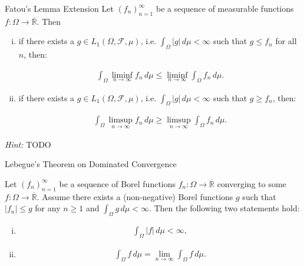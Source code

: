 \documentclass[10pt,landscape]{article}
\renewcommand{\leq}{\leqslant}
\renewcommand{\geq}{\geqslant}
\newcommand{\Hint}{\textit{Hint: }}
\newcommand{\CalF}{\mathcal{F}}
\begin{document}
\begin{multicols}{3}
\begin{corollary}{3.11}{Fatou's Lemma Extension}
    Let $(f_n)_{n=1}^{\infty}$ be a sequence of measurable functions $f: \Omega \to \overline{\mathbb{R}}$. Then

        \begin{enumerate}[(i)]
            \item if there exists a $g \in L_1(\Omega, \CalF, \mu)$, i.e. $\int_{\Omega} |g| \, d\mu < \infty$ such that $g \leq f_n$ for all $n$, then:

            \begin{align*}
                \int_{\Omega} \liminf_{n \to \infty} f_n \, d\mu \leq \liminf_{n \to \infty} \int_{\Omega} f_n \, d\mu.
            \end{align*}
            \item if there exists a $g \in L_1(\Omega, \CalF, \mu)$, i.e. $\int_{\Omega} |g| \, d\mu < \infty$ such that $g \geq f_n$, then:

            \begin{align*}
                \int_{\Omega} \limsup_{n \to \infty} f_n \, d\mu \geq \limsup_{n \to \infty} \int_{\Omega} f_n \, d\mu.
            \end{align*}
        \end{enumerate}

    \Hint TODO

\end{corollary}

\begin{theorem}{3.12}{Lebegue's Theorem on Dominated Convergence}

    Let $(f_n)_{n=1}^{\infty}$ be a sequence of Borel functions $f_n: \Omega \to \overline{\mathbb{R}}$ converging to some $f: \Omega \to \overline{\mathbb{R}}$. Assume there exists a (non-negative) Borel functions $g$ such that $|f_n| \leq g$ for any $n \geq 1$ and $\int_{\Omega} g \, d\mu < \infty$. Then the following two statements hold:

        \begin{enumerate}[(i)]
            \item
                \begin{align*}
                    \int_{\Omega} |f| \, d\mu < \infty,
                \end{align*}
            \item
                \begin{align*}
                    \int_{\Omega} f \, d\mu = \lim_{n \to \infty} \int_{\Omega} f \, d\mu.
                \end{align*}
        \end{enumerate}


\end{theorem}
\end{multicols}
\end{document}
